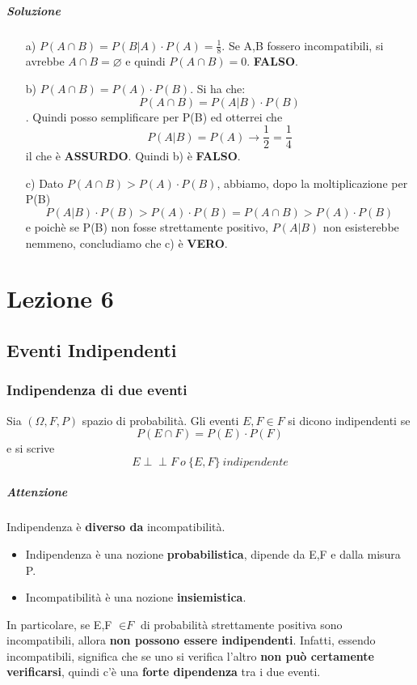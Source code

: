\documentclass{report}
\newcommand{\indep}{\perp \!\!\! \perp}
\begin{document}
\begin{enumerate}
    \paragraph{Soluzione}\begin{itemize}
        \item [a)] \(P(A \cap B) = P(B|A) \cdot P(A) = \frac{1}{8}\). Se A,B fossero incompatibili, si avrebbe \(A \cap B = \varnothing\) e quindi \(P(A \cap B) = 0\). \textbf{FALSO}.
        \item [b)] \(P(A \cap B) = P(A)\cdot P(B)\). Si ha che: \[P(A \cap B) = P(A|B)\cdot P(B)\]. Quindi posso semplificare per P(B) ed otterrei che \[P(A|B) = P(A) \xrightarrow{} \frac{1}{2} = \frac{1}{4}\] il che è \textbf{ASSURDO}. Quindi b) è \textbf{FALSO}.
        \item [c)] Dato \(P(A \cap B) > P(A) \cdot P(B)\), abbiamo, dopo la moltiplicazione per P(B) \[P(A|B) \cdot P(B) > P(A) \cdot P(B) = P(A \cap B) > P(A) \cdot P(B)\] e poichè se P(B) non fosse strettamente positivo, \(P(A|B)\) non esisterebbe nemmeno, concludiamo che c) è \textbf{VERO}.
    \end{itemize}
\end{enumerate}
\chapter{Lezione 6}
\section{Eventi Indipendenti}
\subsection{Indipendenza di due eventi}
Sia \((\Omega, \textit{F}, P)\) spazio di probabilità. Gli eventi \(E, F \in \textit{F}\) si dicono indipendenti se \[P(E \cap F) = P(E) \cdot P(F)\] e si scrive \[E \indep F\ o\ \{E, F\}\ indipendente\]
\paragraph{Attenzione} Indipendenza è \textbf{diverso da} incompatibilità. \begin{itemize}
    \item Indipendenza è una nozione \textbf{probabilistica}, dipende da E,F e dalla misura P.
    \item Incompatibilità è una nozione \textbf{insiemistica}.
\end{itemize}
In particolare, se E,F \(\in \textit{F}\) di probabilità strettamente positiva sono incompatibili, allora \textbf{non possono essere indipendenti}. Infatti, essendo incompatibili, significa che se uno si verifica l'altro \textbf{non può certamente verificarsi}, quindi c'è una \textbf{forte dipendenza} tra i due eventi.
\end{document}
